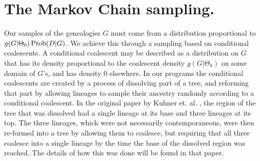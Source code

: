 \section{The Markov Chain sampling.}

Our samples of the genealogies $G$ must come from a distribution
proportional to $g(G|\Theta_0) \mathop{\rm Prob}\nolimits(D|G)$.  We achieve this through
a sampling based on conditional coalescents.  A conditional coalescent may
be described as a distribution on $G$ that has its density proportional to
the coalescent density $g(G|\Theta_0)$ on some domain of $G$'s, and has
density 0 elsewhere.  In our programs the conditional coalescents are
created by a process of dissolving part of a tree, and reforming that part
by allowing lineages to sample their ancestry randomly according to a
conditional coalescent.  In the original paper by Kuhner et. al. \cite{Kuhner95},
the region of the tree that was dissolved had a single lineage at its
base and three lineages at its top.  The three lineages, which were not
necessarily contemporaneous, were then re-formed into a tree by allowing
them to coalesce, but requiring that all three coalesce into a single
lineage by the time the base of the dissolved region was reached.  The
details of how this was done will be found in that paper.

